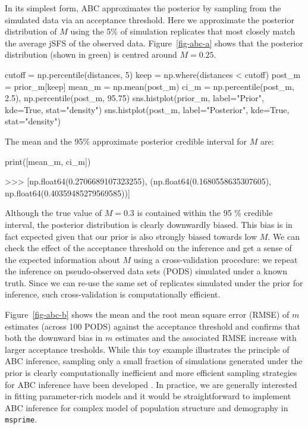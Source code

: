 \documentclass[graybox]{svmult}
\newcommand{\msprime}[0]{\texttt{msprime}}
\begin{document}
    In its simplest form, ABC approximates the posterior by sampling from
the simulated data via an acceptance threshold. Here we approximate the
posterior distribution of \(M\) using the 5\% of simulation replicates
that most closely match the average jSFS of the observed data.
Figure~\ref{fig-abc-a} shows that the posterior
distribution (shown in green) is centred around \(M=0.25\).
\begin{pythoncode}
cutoff = np.percentile(distances, 5)
keep = np.where(distances < cutoff)
post_m = prior_m[keep]
mean_m = np.mean(post_m)
ci_m = np.percentile(post_m, 2.5), np.percentile(post_m, 95.75)
sns.histplot(prior_m, label="Prior", kde=True, stat="density")
sns.histplot(post_m, label="Posterior", kde=True, stat="density")
\end{pythoncode}

The mean and the 95\% approximate posterior credible interval for \(M\)
are:
\begin{pythoncode}
print([mean_m, ci_m])

>>> [np.float64(0.2706689107323255),
    (np.float64(0.1680558635307605),
     np.float64(0.40359485279569585))]
\end{pythoncode}


Although the true value of \(M=0.3\) is contained within the 95 \% credible interval, the posterior distribution is clearly downwardly biased. This bias is in fact expected given that our prior is also strongly biased towards low \(M\). We can check the effect of the acceptance threshold on the inference and get a sense of the expected information about \(M\) using a cross-validation procedure: we repeat the inference on pseudo-observed data sets (PODS) simulated under a known truth. Since we can re-use the same set of replicates simulated under the prior for inference, such cross-validation is computationally efficient.

Figure~\ref{fig-abc-b} shows the mean and the root mean square error (RMSE) of \(m\) estimates (across 100 PODS) against the acceptance threshold and confirms that both the downward bias in \(m\) estimates and the associated RMSE increase with larger acceptance tresholds. While this toy example illustrates the principle of ABC inference, sampling only a small fraction of simulations generated under the prior is clearly computationally inefficient and more efficient sampling strategies for ABC inference have been developed \citep{Beaumont2002}. In practice, we are generally interested in fitting parameter-rich models and it would be straightforward to implement ABC inference for complex model of population structure and demography in \msprime.
\end{document}
